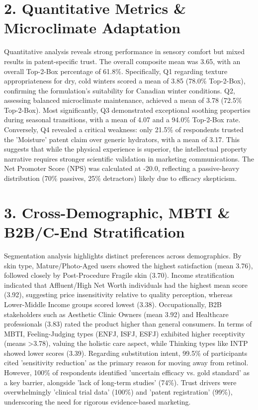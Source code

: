 \documentclass[10pt,twocolumn,a4paper]{article}
\begin{document}
\section{2. Quantitative Metrics \& Microclimate Adaptation}
Quantitative analysis reveals strong performance in sensory comfort but mixed results in patent-specific trust. The overall composite mean was 3.65, with an overall Top-2-Box percentage of 61.8\%. Specifically, Q1 regarding texture appropriateness for dry, cold winters scored a mean of 3.85 (78.0\% Top-2-Box), confirming the formulation's suitability for Canadian winter conditions. Q2, assessing balanced microclimate maintenance, achieved a mean of 3.78 (72.5\% Top-2-Box). Most significantly, Q3 demonstrated exceptional soothing properties during seasonal transitions, with a mean of 4.07 and a 94.0\% Top-2-Box rate. Conversely, Q4 revealed a critical weakness: only 21.5\% of respondents trusted the 'Moisture' patent claim over generic hydrators, with a mean of 3.17. This suggests that while the physical experience is superior, the intellectual property narrative requires stronger scientific validation in marketing communications. The Net Promoter Score (NPS) was calculated at -20.0, reflecting a passive-heavy distribution (70\% passives, 25\% detractors) likely due to efficacy skepticism.
\section{3. Cross-Demographic, MBTI \& B2B/C-End Stratification}
Segmentation analysis highlights distinct preferences across demographics. By skin type, Mature/Photo-Aged users showed the highest satisfaction (mean 3.76), followed closely by Post-Procedure Fragile skin (3.70). Income stratification indicated that Affluent/High Net Worth individuals had the highest mean score (3.92), suggesting price insensitivity relative to quality perception, whereas Lower-Middle Income groups scored lowest (3.38). Occupationally, B2B stakeholders such as Aesthetic Clinic Owners (mean 3.92) and Healthcare professionals (3.83) rated the product higher than general consumers. In terms of MBTI, Feeling-Judging types (ENFJ, ISFJ, ESFJ) exhibited higher receptivity (means >3.78), valuing the holistic care aspect, while Thinking types like INTP showed lower scores (3.39). Regarding substitution intent, 99.5\% of participants cited 'sensitivity reduction' as the primary reason for moving away from retinol. However, 100\% of respondents identified 'uncertain efficacy vs. gold standard' as a key barrier, alongside 'lack of long-term studies' (74\%). Trust drivers were overwhelmingly 'clinical trial data' (100\%) and 'patent registration' (99\%), underscoring the need for rigorous evidence-based marketing.
\end{document}
